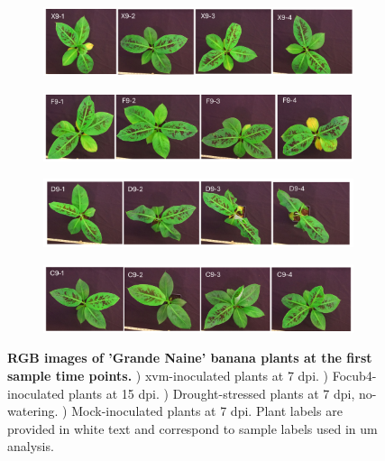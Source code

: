 \begin{figure}[ph!]
  \centering
  \begin{subfigure}[b]{\textwidth}
    \includegraphics[width=\textwidth]{Figures/FirstTimePointXanthomonasBLQs.pdf}
    \caption{}
    \label{fig:XvmFirstTimeBLQs}
  \end{subfigure}
   \begin{subfigure}[b]{\textwidth}
    \includegraphics[width=\textwidth]{Figures/FirstTimePointFusariumBLQs.pdf}
    \caption{}
    \label{fig:FocFirstTimeBLQs}
  \end{subfigure}
     \begin{subfigure}[b]{\textwidth}
    \includegraphics[width=\textwidth]{Figures/FirstTimePointDroughtBLQs.pdf}
    \caption{}
    \label{fig:DroFirstTimeBLQs}
  \end{subfigure}
     \begin{subfigure}[b]{\textwidth}
    \includegraphics[width=\textwidth]{Figures/FirstTimePointControlBLQs.pdf}
    \caption{}
    \label{fig:ConFirstTimeBLQs}
  \end{subfigure}
  \caption[RGB images of 'Grande Naine' banana plants at the first sample time points.]{\textbf{RGB images of 'Grande Naine' banana plants at the first sample time points.}
  \textbf{}) \acl{xvm}-inoculated plants at 7 \acl{dpi}.
  \textbf{}) \acl{Focub4}-inoculated plants at 15 \acl{dpi}.
  \textbf{}) Drought-stressed plants at 7 \ac{dpi}, no-watering.
  \textbf{}) Mock-inoculated plants at 7 \ac{dpi}.
  Plant labels are provided in white text and correspond to sample labels used in \acl{um} analysis.
  }
  \label{fig:FirstTimePointSymptoms}
\end{figure}

